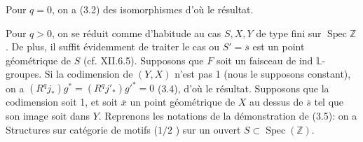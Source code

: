 Pour $q=0$, on a (3.2) des isomorphismes
d'où le résultat.

Pour $q>0$, on se réduit comme d'habitude au cas $S,X,Y$ de type fini sur $\operatorname{Spec}\mathbb Z$. De plus, il suffit  évidemment de traiter le cas ou $S'=\overline s$ est un point  géométrique de $S$ (cf. XII.6.5).
\margin{!}
Supposons que $F$ soit un faisceau de  ind $\mathbb L$-groupes. Si la codimension de $(Y,X)$ n'est pas 1 \deleted{\unsure{,}} (nous le supposons constant), on a $(R^qj_*)g^*=(R^qj'_*){g'}^*=0$ (3.4), d'où le résultat. Supposons que la codimension soit 1, et soit $\overline x$ un point géométrique de $X$ au dessus de $\overline s$ tel que son image soit dans $Y$. Reprenons les  notations de la démonstration de (3.5): on a
Structures sur catégorie  de  motifs ($1/2$ ) sur un ouvert $S\subset\operatorname{Spec}(\mathbb Z)$.

